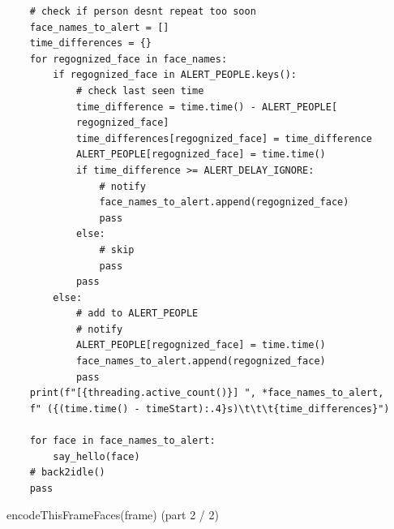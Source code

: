\documentclass[a4paper,12pt,reqno]{article}
\begin{document}
\begin{listing}[H]%
\begin{mdframed}[backgroundcolor=codebg]
\begin{verbatim}
    # check if person desnt repeat too soon
    face_names_to_alert = []
    time_differences = {}
    for regognized_face in face_names:
        if regognized_face in ALERT_PEOPLE.keys():
            # check last seen time
            time_difference = time.time() - ALERT_PEOPLE[
            regognized_face]
            time_differences[regognized_face] = time_difference
            ALERT_PEOPLE[regognized_face] = time.time()
            if time_difference >= ALERT_DELAY_IGNORE:
                # notify
                face_names_to_alert.append(regognized_face)
                pass
            else:
                # skip
                pass
            pass
        else:
            # add to ALERT_PEOPLE
            # notify
            ALERT_PEOPLE[regognized_face] = time.time()
            face_names_to_alert.append(regognized_face)
            pass
    print(f"[{threading.active_count()}] ", *face_names_to_alert, 
    f" ({(time.time() - timeStart):.4}s)\t\t\t{time_differences}")
    
    for face in face_names_to_alert:
        say_hello(face)
    # back2idle()
    pass
\end{verbatim}
\end{mdframed}
\caption{encodeThisFrameFaces(frame) (part 2 / 2)}
\label{listing:py_encodeThisFrameFaces_2}
\end{listing}
\end{document}
